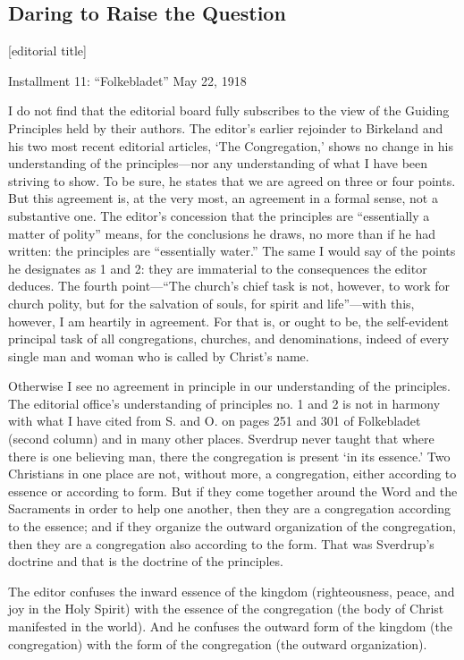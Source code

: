 

\subsection{Daring to Raise the Question} 
[editorial title]


Installment 11: “Folkebladet” May 22, 1918

I do not find that the editorial board fully subscribes to the view of the Guiding Principles held by their authors. The editor’s earlier rejoinder to Birkeland and his two most recent editorial articles, ‘The Congregation,’ shows no change in his understanding of the principles—nor any understanding of what I have been striving to show. To be sure, he states that we are agreed on three or four points. But this agreement is, at the very most, an agreement in a formal sense, not a substantive one. The editor’s concession that the principles are “essentially a matter of polity” means, for the conclusions he draws, no more than if he had written: the principles are “essentially water.” The same I would say of the points he designates as 1 and 2: they are immaterial to the consequences the editor deduces. The fourth point—“The church’s chief task is not, however, to work for church polity, but for the salvation of souls, for spirit and life”—with this, however, I am heartily in agreement. For that is, or ought to be, the self-evident principal task of all congregations, churches, and denominations, indeed of every single man and woman who is called by Christ’s name.

Otherwise I see no agreement in principle in our understanding of the principles. The editorial office’s understanding of principles no. 1 and 2 is not in harmony with what I have cited from S. and O. on pages 251 and 301 of Folkebladet (second column) and in many other places. Sverdrup never taught that where there is one believing man, there the congregation is present ‘in its essence.’ Two Christians in one place are not, without more, a congregation, either according to essence or according to form. But if they come together around the Word and the Sacraments in order to help one another, then they are a congregation according to the essence; and if they organize the outward organization of the congregation, then they are a congregation also according to the form. That was Sverdrup’s doctrine and that is the doctrine of the principles.

The editor confuses the inward essence of the kingdom (righteousness, peace, and joy in the Holy Spirit) with the essence of the congregation (the body of Christ manifested in the world). And he confuses the outward form of the kingdom (the congregation) with the form of the congregation (the outward organization).

